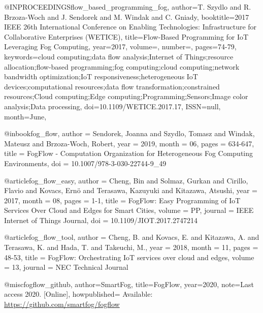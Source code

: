 @INPROCEEDINGS{flow_based_programming_fog,
    author={T. {Szydlo} and R. {Brzoza-Woch} and J. {Sendorek} and M. {Windak} and C. {Gniady}},
    booktitle={2017 IEEE 26th International Conference on Enabling Technologies: Infrastructure for Collaborative Enterprises (WETICE)},
    title={Flow-Based Programming for IoT Leveraging Fog Computing},
    year={2017},
    volume={},
    number={},
    pages={74-79},
    keywords={cloud computing;data flow analysis;Internet of Things;resource allocation;flow-based programming;fog computing;cloud computing;network bandwidth optimization;IoT responsiveness;heterogeneous IoT devices;computational resources;data flow transformation;constrained resources;Cloud computing;Edge computing;Programming;Sensors;Image color analysis;Data processing},
    doi={10.1109/WETICE.2017.17},
    ISSN={null},
    month={June},
}

@inbook{fog_flow,
    author = {Sendorek, Joanna and Szydlo, Tomasz and Windak, Mateusz and Brzoza-Woch, Robert},
    year = {2019},
    month = {06},
    pages = {634-647},
    title = {FogFlow - Computation Organization for Heterogeneous Fog Computing Environments},
    doi = {10.1007/978-3-030-22744-9_49}
}

@article{fog_flow_easy,
    author = {Cheng, Bin and Solmaz, Gurkan and Cirillo, Flavio and Kovacs, Ernö and Terasawa, Kazuyuki and Kitazawa, Atsushi},
    year = {2017},
    month = {08},
    pages = {1-1},
    title = {FogFlow: Easy Programming of IoT Services Over Cloud and Edges for Smart Cities},
    volume = {PP},
    journal = {IEEE Internet of Things Journal},
    doi = {10.1109/JIOT.2017.2747214}
}

@article{fog_flow_tool,
    author = {Cheng, B. and Kovacs, E. and Kitazawa, A. and Terasawa, K. and Hada, T. and Takeuchi, M.},
    year = {2018},
    month = {11},
    pages = {48-53},
    title = {FogFlow: Orchestrating IoT services over cloud and edges},
    volume = {13},
    journal = {NEC Technical Journal}
}

@misc{fogflow_github,
    author={SmartFog},
    title={{FogFlow}},
    year={2020},
    note={Last access 2020. [Online]},
    howpublished= {Available: \url{https://github.com/smartfog/fogflow}}
}

